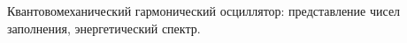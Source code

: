 \documentclass[__main__.tex]{subfiles}
\begin{document}
Квантовомеханический гармонический осциллятор: представление чисел заполнения, энергетический спектр.\\ 

\end{document}
